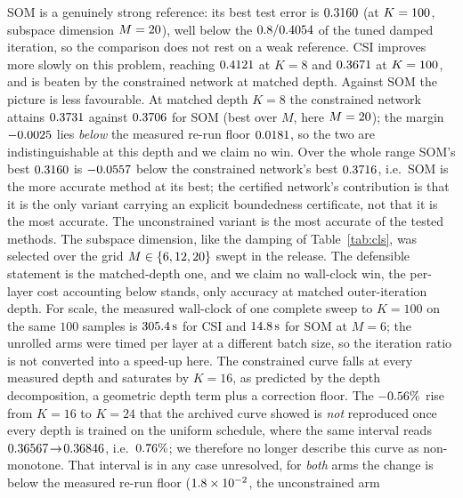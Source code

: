 \documentclass[journal,cmes,article,submit,moreauthors,pdftex]{Definitions/tsp}
\newcommand{\numv}[1]{#1}
\begin{document}
SOM is a genuinely strong reference: its best test error is $\numv{\NumSomBest}$ (at
$K=\numv{\NumSomBestK}$, subspace dimension $M=\numv{\NumSomBestM}$), well below the
$\numv{\NumClsSweepBest}$ of the tuned damped iteration, so the comparison does not rest on a
weak reference. CSI improves more slowly on this problem, reaching $\numv{\NumCsiAtKEight}$ at
$K=8$ and $\numv{\NumCsiBest}$ at $K=\numv{\NumCsiBestK}$, and is beaten by the constrained
network at matched depth. Against SOM the picture is less favourable. At matched depth $K=8$ the constrained network attains $\numv{\NumConsEight}$ against
$\numv{\NumSomAtKEight}$ for SOM (best over $M$, here $M=\numv{\NumSomAtKEightM}$); the margin
$\numv{\NumSomMargKEight}$ lies \emph{below} the measured re-run floor
$\numv{\NumRepFloorMaxRre}$, so the two are indistinguishable at this depth and we claim no win.
Over the whole range SOM's best $\numv{\NumSomBest}$ is $\numv{\NumSomMargBest}$ below the
constrained network's best $\numv{\NumConsBest}$, i.e.\ SOM is the more accurate method at its
best; the certified network's contribution is that it is the only variant carrying an explicit
boundedness certificate, not that it is the most accurate. The unconstrained variant is the most
accurate of the tested methods. The subspace dimension,
like the damping of Table~\ref{tab:cls}, was selected over the grid
$M\in\{\numv{\NumSomMGrid}\}$ swept in the release. The defensible
statement is the matched-depth one, and we claim no wall-clock win, the per-layer cost
accounting below stands, only accuracy at matched outer-iteration depth. For scale, the measured
wall-clock of one complete sweep to $K=100$ on the same $100$ samples is
$\SI{\numv{\NumCsiSecHundred}}{\second}$ for CSI and
$\SI{\numv{\NumSomSecHundred}}{\second}$ for SOM at $M=6$; the unrolled arms were timed per layer
at a different batch size, so the iteration ratio is not converted into a speed-up here. The constrained curve
falls at every measured depth and saturates by $K=16$, as predicted by the depth decomposition, a geometric depth term plus a
correction floor. The $\numv{\NumDepDeltaArchPct}\%$ rise from $K=16$ to
$K=24$ that the archived curve showed is \emph{not} reproduced once every depth is trained on the
uniform schedule, where the same interval reads
$\numv{\NumDepUniConsSixteen}\!\to\!\numv{\NumDepUniConsTwentyFour}$, i.e.\
$\numv{\NumDepDeltaUniPct}\%$; we therefore no longer describe this curve as
non-monotone. That interval is in any case unresolved, for \emph{both}
arms the change is below the measured re-run floor ($\numv{\NumDepUniFloor}$, the unconstrained arm
\end{document}
